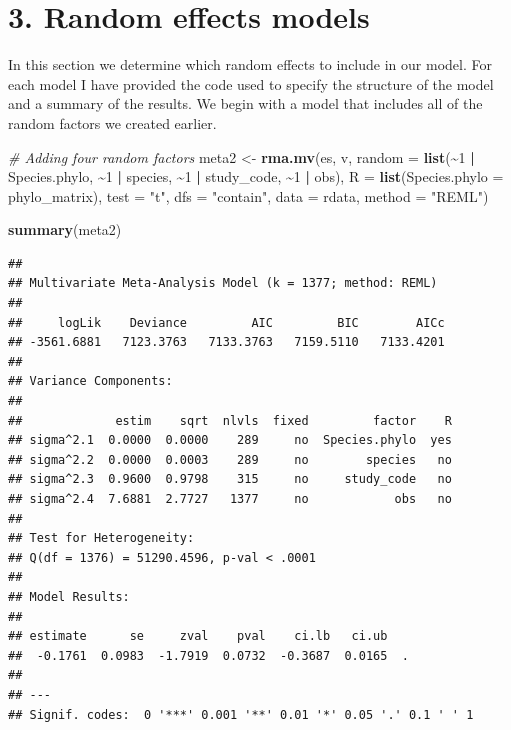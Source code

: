 \documentclass[
]{article}
\newenvironment{Shaded}{\begin{snugshade}}{\end{snugshade}}
\newcommand{\AttributeTok}[1]{\textcolor[rgb]{0.13,0.29,0.53}{#1}}
\newcommand{\CommentTok}[1]{\textcolor[rgb]{0.56,0.35,0.01}{\textit{#1}}}
\newcommand{\DecValTok}[1]{\textcolor[rgb]{0.00,0.00,0.81}{#1}}
\newcommand{\FunctionTok}[1]{\textcolor[rgb]{0.13,0.29,0.53}{\textbf{#1}}}
\newcommand{\NormalTok}[1]{#1}
\newcommand{\OtherTok}[1]{\textcolor[rgb]{0.56,0.35,0.01}{#1}}
\newcommand{\SpecialCharTok}[1]{\textcolor[rgb]{0.81,0.36,0.00}{\textbf{#1}}}
\newcommand{\StringTok}[1]{\textcolor[rgb]{0.31,0.60,0.02}{#1}}
\begin{document}
\newpage

\hypertarget{random-effects-models}{%
\section{3. Random effects models}\label{random-effects-models}}

In this section we determine which random effects to include in our
model. For each model I have provided the code used to specify the
structure of the model and a summary of the results. We begin with a
model that includes all of the random factors we created earlier.

\begin{Shaded}
\begin{Highlighting}[]
\CommentTok{\# Adding four random factors}
\NormalTok{meta2 }\OtherTok{\textless{}{-}} \FunctionTok{rma.mv}\NormalTok{(es, v, }\AttributeTok{random =} \FunctionTok{list}\NormalTok{(}\SpecialCharTok{\textasciitilde{}}\DecValTok{1} \SpecialCharTok{|}\NormalTok{ Species.phylo, }\SpecialCharTok{\textasciitilde{}}\DecValTok{1} \SpecialCharTok{|}
\NormalTok{    species, }\SpecialCharTok{\textasciitilde{}}\DecValTok{1} \SpecialCharTok{|}\NormalTok{ study\_code, }\SpecialCharTok{\textasciitilde{}}\DecValTok{1} \SpecialCharTok{|}\NormalTok{ obs), }\AttributeTok{R =} \FunctionTok{list}\NormalTok{(}\AttributeTok{Species.phylo =}\NormalTok{ phylo\_matrix),}
    \AttributeTok{test =} \StringTok{"t"}\NormalTok{, }\AttributeTok{dfs =} \StringTok{"contain"}\NormalTok{, }\AttributeTok{data =}\NormalTok{ rdata, }\AttributeTok{method =} \StringTok{"REML"}\NormalTok{)}
\end{Highlighting}
\end{Shaded}

\begin{Shaded}
\begin{Highlighting}[]
\FunctionTok{summary}\NormalTok{(meta2)}
\end{Highlighting}
\end{Shaded}

\begin{verbatim}
## 
## Multivariate Meta-Analysis Model (k = 1377; method: REML)
## 
##     logLik    Deviance         AIC         BIC        AICc   
## -3561.6881   7123.3763   7133.3763   7159.5110   7133.4201   
## 
## Variance Components:
## 
##             estim    sqrt  nlvls  fixed         factor    R 
## sigma^2.1  0.0000  0.0000    289     no  Species.phylo  yes 
## sigma^2.2  0.0000  0.0003    289     no        species   no 
## sigma^2.3  0.9600  0.9798    315     no     study_code   no 
## sigma^2.4  7.6881  2.7727   1377     no            obs   no 
## 
## Test for Heterogeneity:
## Q(df = 1376) = 51290.4596, p-val < .0001
## 
## Model Results:
## 
## estimate      se     zval    pval    ci.lb   ci.ub    
##  -0.1761  0.0983  -1.7919  0.0732  -0.3687  0.0165  . 
## 
## ---
## Signif. codes:  0 '***' 0.001 '**' 0.01 '*' 0.05 '.' 0.1 ' ' 1
\end{verbatim}
\end{document}
